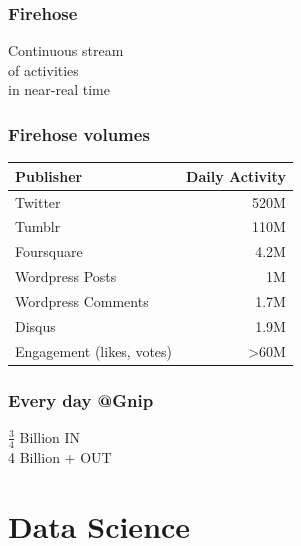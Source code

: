 \documentclass{beamer}
\begin{document}

\begin{frame}\frametitle{Firehose}
\begin{center}
{\Huge Continuous stream \\ [8pt] of activities \\ [15pt] in near-real time}
\end{center}
\end{frame}


\begin{frame} \frametitle{Firehose volumes}
\begin{table}
\begin{tabular}{l|r}
\hline
   {Publisher}   &   {Daily Activity}   \\
\hline 
    Twitter      &      520M   \\
    Tumblr      &       110M   \\
    Foursquare &       4.2M \\
    Wordpress Posts &     1M   \\
    Wordpress Comments & 1.7M \\
    Disqus       &       1.9M  \\
    Engagement (likes, votes) & >60M  \\
\hline
\end{tabular}
\end{table}
\end{frame}

%
\begin{frame}\frametitle{Every day @Gnip}
\begin{center}
{\Huge $\frac{3}{4}$ Billion IN \\ [18pt] 4 Billion + OUT}
\end{center}
\end{frame}


\section{Data Science}
{
\begin{frame}
\textcolor{black} {
\hfill \Huge \insertsection}
\end{frame}
}
\end{document}
